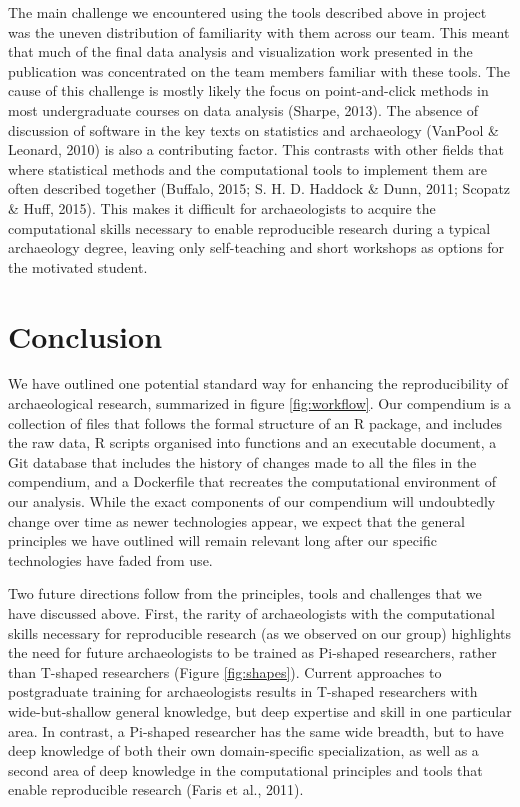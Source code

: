 \documentclass[american,man]{apa6}
\begin{document}
The main challenge we encountered using the tools described above in
project was the uneven distribution of familiarity with them across our
team. This meant that much of the final data analysis and visualization
work presented in the publication was concentrated on the team members
familiar with these tools. The cause of this challenge is mostly likely
the focus on point-and-click methods in most undergraduate courses on
data analysis (Sharpe, 2013). The absence of discussion of software in
the key texts on statistics and archaeology ({VanPool} \& Leonard, 2010)
is also a contributing factor. This contrasts with other fields that
where statistical methods and the computational tools to implement them
are often described together (Buffalo, 2015; S. H. D. Haddock \& Dunn,
2011; Scopatz \& Huff, 2015). This makes it difficult for archaeologists
to acquire the computational skills necessary to enable reproducible
research during a typical archaeology degree, leaving only self-teaching
and short workshops as options for the motivated student.

\section{Conclusion}\label{conclusion}

We have outlined one potential standard way for enhancing the
reproducibility of archaeological research, summarized in figure
\ref{fig:workflow}. Our compendium is a collection of files that follows
the formal structure of an R package, and includes the raw data, R
scripts organised into functions and an executable document, a Git
database that includes the history of changes made to all the files in
the compendium, and a Dockerfile that recreates the computational
environment of our analysis. While the exact components of our
compendium will undoubtedly change over time as newer technologies
appear, we expect that the general principles we have outlined will
remain relevant long after our specific technologies have faded from
use.

Two future directions follow from the principles, tools and challenges
that we have discussed above. First, the rarity of archaeologists with
the computational skills necessary for reproducible research (as we
observed on our group) highlights the need for future archaeologists to
be trained as Pi-shaped researchers, rather than T-shaped researchers
(Figure \ref{fig:shapes}). Current approaches to postgraduate training
for archaeologists results in T-shaped researchers with wide-but-shallow
general knowledge, but deep expertise and skill in one particular area.
In contrast, a Pi-shaped researcher has the same wide breadth, but to
have deep knowledge of both their own domain-specific specialization, as
well as a second area of deep knowledge in the computational principles
and tools that enable reproducible research (Faris et al., 2011).
\end{document}
